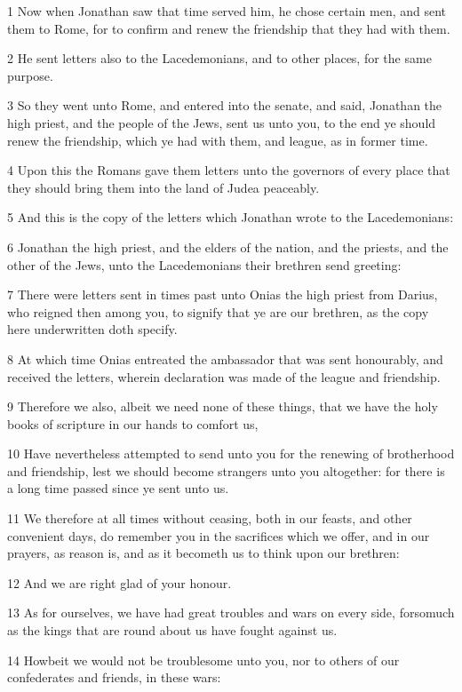 \par 1 Now when Jonathan saw that time served him, he chose certain men, and sent them to Rome, for to confirm and renew the friendship that they had with them.
\par 2 He sent letters also to the Lacedemonians, and to other places, for the same purpose.
\par 3 So they went unto Rome, and entered into the senate, and said, Jonathan the high priest, and the people of the Jews, sent us unto you, to the end ye should renew the friendship, which ye had with them, and league, as in former time.
\par 4 Upon this the Romans gave them letters unto the governors of every place that they should bring them into the land of Judea peaceably.
\par 5 And this is the copy of the letters which Jonathan wrote to the Lacedemonians:
\par 6 Jonathan the high priest, and the elders of the nation, and the priests, and the other of the Jews, unto the Lacedemonians their brethren send greeting:
\par 7 There were letters sent in times past unto Onias the high priest from Darius, who reigned then among you, to signify that ye are our brethren, as the copy here underwritten doth specify.
\par 8 At which time Onias entreated the ambassador that was sent honourably, and received the letters, wherein declaration was made of the league and friendship.
\par 9 Therefore we also, albeit we need none of these things, that we have the holy books of scripture in our hands to comfort us,
\par 10 Have nevertheless attempted to send unto you for the renewing of brotherhood and friendship, lest we should become strangers unto you altogether: for there is a long time passed since ye sent unto us.
\par 11 We therefore at all times without ceasing, both in our feasts, and other convenient days, do remember you in the sacrifices which we offer, and in our prayers, as reason is, and as it becometh us to think upon our brethren:
\par 12 And we are right glad of your honour.
\par 13 As for ourselves, we have had great troubles and wars on every side, forsomuch as the kings that are round about us have fought against us.
\par 14 Howbeit we would not be troublesome unto you, nor to others of our confederates and friends, in these wars:

